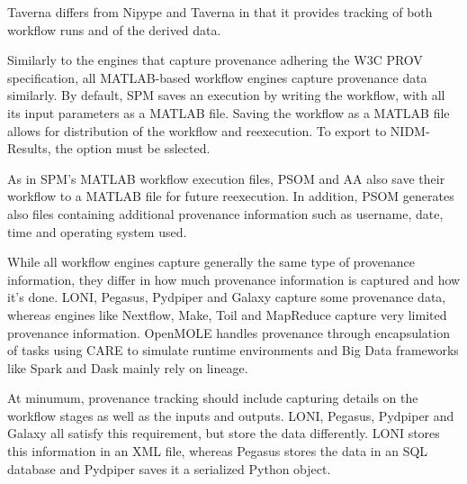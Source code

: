             Taverna differs from Nipype and Taverna in that it provides 
            tracking of both workflow runs and of the derived data.

            Similarly to the engines that capture provenance adhering the
            W3C PROV specification, all MATLAB-based workflow engines capture
            provenance data similarly.
            By default, SPM saves an execution by writing the  workflow, with
            all its input parameters as a MATLAB file. Saving the workflow as
            a MATLAB file allows for distribution of the workflow and 
            reexecution. To export to NIDM-Results, the option must be 
            sslected.
            
            As in SPM's MATLAB workflow execution files, PSOM and AA 
            also save
            their workflow to a MATLAB file for future reexecution. 
            In addition, PSOM generates
            also files containing additional provenance information such 
            as username, date, time and operating system used.
            
            While all workflow engines capture generally the same type of 
            provenance information, they differ in how much provenance 
            information is captured and how it's done. LONI, Pegasus, Pydpiper 
            and Galaxy
            capture some provenance data, whereas engines 
            like Nextflow, Make, Toil and MapReduce capture very limited  
            provenance 
            information. OpenMOLE handles provenance through encapsulation of
            tasks using CARE to simulate runtime environments
            and Big Data frameworks like Spark and Dask mainly rely on 
            lineage.

            At minumum, provenance tracking should include 
            capturing details on the workflow stages as well as the inputs and
            outputs. LONI, Pegasus, Pydpiper and Galaxy all satisfy this 
            requirement, but store the data differently. LONI stores this 
            information in an XML file, whereas Pegasus stores the data in an 
            SQL database and Pydpiper saves it a serialized Python object.

